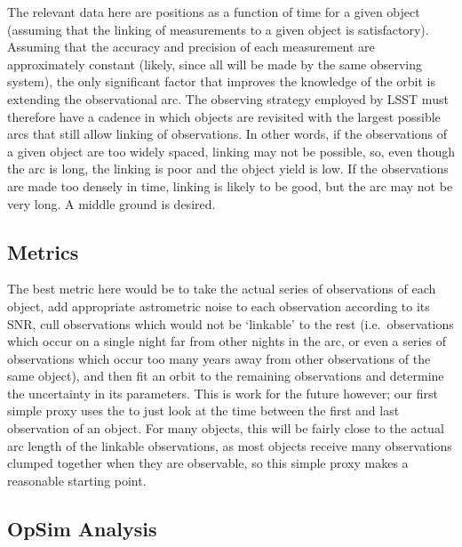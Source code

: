 The relevant data here are positions as a function of time for a given
object (assuming that the linking of measurements to a given object is
satisfactory). Assuming that the accuracy and precision of each
measurement are approximately constant (likely, since all will be made
by the same observing system), the only significant factor that improves
the knowledge of the orbit is extending the observational arc. The
observing strategy employed by LSST must therefore have a cadence in
which objects are revisited with the largest possible arcs that still
allow linking of observations. In other words, if the observations of a
given object are too widely spaced, linking may not be possible, so,
even though the arc is long, the linking is poor and the object yield is
low. If the observations are made too densely in time, linking is likely
to be good, but the arc may not be very long. A middle ground is
desired.


\subsection{Metrics}
\label{sec:\secname:metrics}

The best metric here would be to take the actual series of observations
of each object, add appropriate astrometric noise to each observation
according to its SNR, cull observations which would not be `linkable' to
the rest (i.e.\ observations which occur on a single night far from other
nights in the arc, or even a series of observations which occur too many
years away from other observations of the same object), and then fit an
orbit to the remaining observations and determine the uncertainty in its
parameters. This is work for the future however; our first simple proxy
uses the  to just look at the time between the first
and last observation of an object. For many objects, this will be fairly
close to the actual arc length of the linkable observations, as most
objects receive many observations clumped together when they are
observable, so this simple proxy makes a reasonable starting point.



\subsection{OpSim Analysis}
\label{sec:\secname:analysis}

